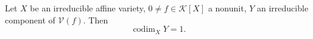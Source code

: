 Let $X$ be an irreducible affine variety, $0 \neq f \in \mathcal{K}[X]$ a nonunit, $Y$ an irreducible component of $\mathcal{V}(f)$. Then
$$\operatorname{codim}_X Y = 1.$$
